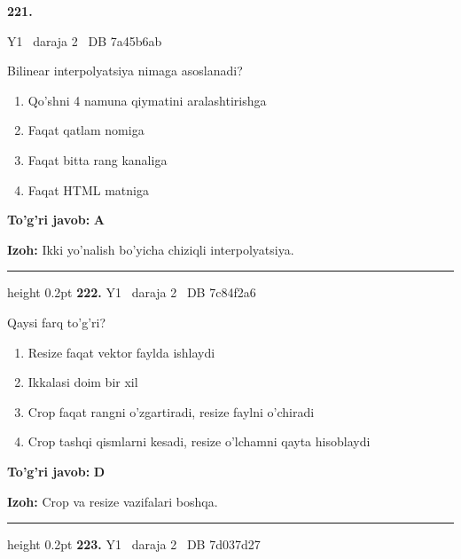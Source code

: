 \documentclass[10pt,a4paper,oneside]{article}
\begin{document}
\hypertarget{q221}{\textbf{\color{ink}221.}}  {\color{muted}\scriptsize Y1 \textbullet\ daraja 2 \textbullet\ DB 7a45b6ab}
\par
Bilinear interpolyatsiya nimaga asoslanadi?
\begin{enumerate}[label=\Alph*),leftmargin=9mm]
\item Qo'shni 4 namuna qiymatini aralashtirishga
\item Faqat qatlam nomiga
\item Faqat bitta rang kanaliga
\item Faqat HTML matniga
\end{enumerate}
\begin{tcolorbox}[enhanced,breakable,colback=teal!4,colframe=teal!45!black,boxrule=0.45pt,arc=1.2mm,left=2.8mm,right=2.8mm,top=2mm,bottom=2mm,before skip=2mm,after skip=2mm]
\textbf{\color{teal}To'g'ri javob:} \textbf{A}
\par\smallskip
\textbf{Izoh:} Ikki yo'nalish bo'yicha chiziqli interpolyatsiya.
\end{tcolorbox}
\vspace{2mm}\hrule height 0.2pt \vspace{4mm}
\hypertarget{q222}{\textbf{\color{ink}222.}}  {\color{muted}\scriptsize Y1 \textbullet\ daraja 2 \textbullet\ DB 7c84f2a6}
\par
Qaysi farq to'g'ri?
\begin{enumerate}[label=\Alph*),leftmargin=9mm]
\item Resize faqat vektor faylda ishlaydi
\item Ikkalasi doim bir xil
\item Crop faqat rangni o'zgartiradi, resize faylni o'chiradi
\item Crop tashqi qismlarni kesadi, resize o'lchamni qayta hisoblaydi
\end{enumerate}
\begin{tcolorbox}[enhanced,breakable,colback=teal!4,colframe=teal!45!black,boxrule=0.45pt,arc=1.2mm,left=2.8mm,right=2.8mm,top=2mm,bottom=2mm,before skip=2mm,after skip=2mm]
\textbf{\color{teal}To'g'ri javob:} \textbf{D}
\par\smallskip
\textbf{Izoh:} Crop va resize vazifalari boshqa.
\end{tcolorbox}
\vspace{2mm}\hrule height 0.2pt \vspace{4mm}
\hypertarget{q223}{\textbf{\color{ink}223.}}  {\color{muted}\scriptsize Y1 \textbullet\ daraja 2 \textbullet\ DB 7d037d27}
\end{document}
